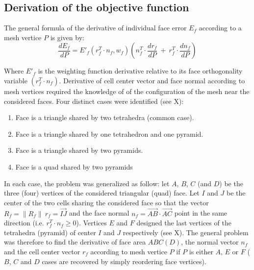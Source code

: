 \documentclass[11pt]{article}
\begin{document}
\subsection{Derivation of the objective function}

The general formula of the derivative of individual face error $E_f$ according to a mesh vertice $P$ is given by:
\begin{equation}
\frac{dE_f}{dP} = E'_f\left( r_f^T \cdot n_f, w_f \right) \left(n_f^T \cdot \frac{d r_f}{dP}\ +\ r_f^T \cdot \frac{d n_f}{dP}\right)
\label{general_derivative_expression}
\end{equation}

Where $E'_f$ is the weighting function derivative relative to its face orthogonality variable $(r_f^T \cdot n_f)$.
Derivative of cell center vector and face normal according to mesh vertices required the knowledge of of the configuration of the mesh near the considered faces. Four distinct cases were identified (see X):
\begin{enumerate}
  \item Face is a triangle shared by two tetrahedra (common case). 
  \item Face is a triangle shared by one tetrahedron and one pyramid.
  \item Face is a triangle shared by two pyramids.
  \item Face is a quad shared by two pyramids
\end{enumerate}

In each case, the problem was generalized as follow: let $A$, $B$, $C$ (and $D$) be the three (four) vertices of the considered triangular (quad) face. 
Let $I$ and $J$ be the center of the two cells sharing the considered face so that the vector $R_f=\|R_f\|\ r_f = \overrightarrow{IJ}$ and the face normal $n_f = \overrightarrow{AB} \cdot \overrightarrow{AC}$ point in the same direction (i.e. $r_f^T \cdot n_f \geq 0$).
Vertices $E$ and $F$ designed the last vertices of the tetrahedra (pyramid) of center $I$ and $J$ respectively (see X).
The general problem was therefore to find the derivative of face area $ABC(D)$, the normal vector $n_f$ and the cell center vector $r_f$ according to mesh vertice $P$ if $P$ is either $A$, $E$ or $F$ ($B$, $C$ and $D$ cases are recovered by simply reordering face vertices). 
\end{document}
